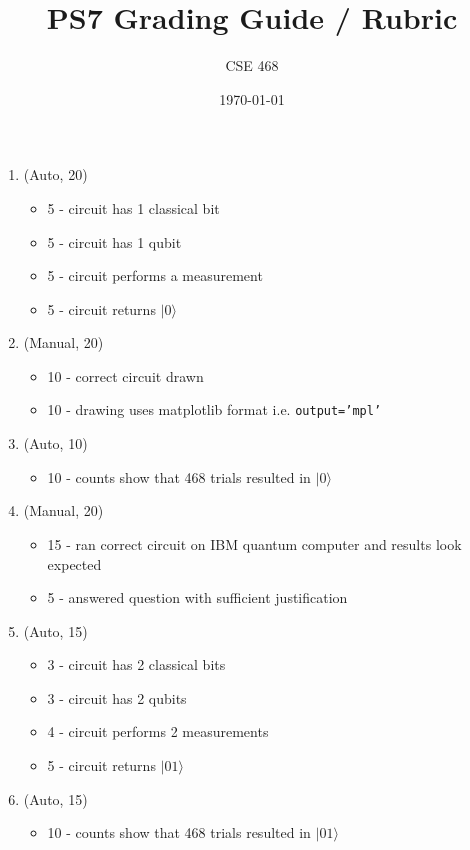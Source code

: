 \documentclass[12pt]{article}
\title{PS7 Grading Guide / Rubric}
\author{CSE 468}
\date{\today}
\begin{document}
\maketitle

\begin{enumerate}[font=\bfseries]
    \item (Auto, 20) 
    \begin{itemize}
        \item 5 - circuit has 1 classical bit
        \item 5 - circuit has 1 qubit
        \item 5 - circuit performs a measurement
        \item 5 - circuit returns $|0\rangle$
    \end{itemize}
    \item (Manual, 20)
    \begin{itemize}
        \item 10 - correct circuit drawn
        \item 10 - drawing uses matplotlib format i.e. \texttt{output='mpl'}
    \end{itemize}
    \item (Auto, 10) 
    \begin{itemize}
        \item 10 - counts show that 468 trials resulted in $|0\rangle$
    \end{itemize}
    \item (Manual, 20)
    \begin{itemize}
        \item 15 - ran correct circuit on IBM quantum computer and results look expected
        \item 5 - answered question with sufficient justification
    \end{itemize}
    \item (Auto, 15) 
    \begin{itemize}
        \item 3 - circuit has 2 classical bits
        \item 3 - circuit has 2 qubits
        \item 4 - circuit performs 2 measurements
        \item 5 - circuit returns $|01\rangle$
    \end{itemize}
    \item (Auto, 15) 
    \begin{itemize}
        \item 10 - counts show that 468 trials resulted in $|01\rangle$
    \end{itemize}
\end{enumerate}
\end{document}

